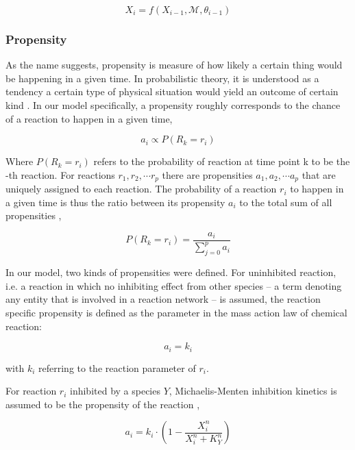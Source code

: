 \documentclass{bioinfo}
\begin{document}
\begin{equation}
X_i = f(X_{i - 1}, \mathcal{M}, \theta_{i - 1})\label{eq:02}
\end{equation}

\subsubsection{Propensity}

As the name suggests, propensity is measure of how likely a certain thing would be happening in a given time. In probabilistic theory, it is understood as a tendency a certain type of physical situation would yield an outcome of certain kind \citep{Nodelman03}. In our model specifically, a propensity roughly corresponds to the chance of a reaction to happen in a given time,

\begin{equation}
a_i \propto P(R_k = r_i)
\end{equation}

Where $P(R_k = r_i)$ refers to the probability of reaction at time point k to be the -th reaction. For reactions $r_1, r_2, \cdots r_p$ there are propensities $a_1, a_2, \cdots a_p$ that are uniquely assigned to each reaction. The probability of a reaction $r_i$ to happen in a given time is thus the ratio between its propensity $a_i$ to the total sum of all propensities \citep{Gillespie77},

\begin{equation}
P(R_k = r_i) = \frac{a_i}{\sum_{j=0}^{p} a_i}
\end{equation}

In our model, two kinds of propensities were defined. For uninhibited reaction, i.e. a reaction in which no inhibiting effect from other species -- a term denoting any entity that is involved in a reaction network -- is assumed, the reaction specific propensity is defined as the parameter in the mass action law of chemical reaction:

\begin{equation}
a_i = k_i \label{eq:23}
\end{equation}

with $k_i$ referring to the reaction parameter of $r_i$.

For reaction $r_i$ inhibited by a species $Y$, Michaelis-Menten inhibition kinetics is assumed to be the propensity of the reaction \citep{MichaelisMenten13},

\begin{equation}
a_i = k_i \cdot (1 - \frac{X_i^{n}}{X_i^{n} + K_{Y}^{n}})\label{eq:24}
\end{equation}
\end{document}
